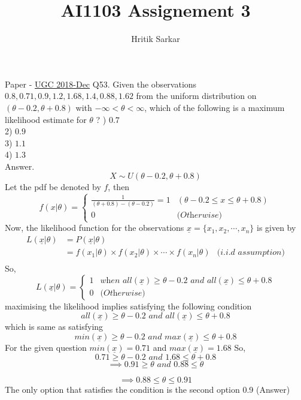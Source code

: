 \documentclass{article}
\title{AI1103 Assignement 3}
\author{Hritik Sarkar}
\theoremstyle{remark}
\renewcommand{\vec}[1]{\underline{#1}}
\begin{document}
\maketitle
Paper - \href{https://github.com/gadepall/papers/blob/master/ugc/math/dec-math-set-a-2018.pdf}{UGC 2018-Dec}
\newline
\newline
Q53. Given the observations $0.8,0.71,0.9,1.2,1.68,1.4,0.88,1.62$ from the uniform distribution on $(\theta-0.2,\theta+0.8)$ with $-\infty< \theta < \infty$, which of the following is a maximum likelihood estimate for $\theta$ ?
) $0.7$ \\
2) $0.9$ \\
3) $1.1$ \\
4) $1.3$ \\
\newline
Answer.
\[
    X \sim U(\theta-0.2,\theta+0.8)
\]
Let the pdf be denoted by $f$, then
\[
    f(x|\theta) = 
    \begin{cases}
     \frac{1}{(\theta+0.8)-(\theta-0.2)} = 1 &(\theta-0.2 \le x \le \theta+0.8)
     \\ 0 &\textit{(Otherwise)}
\end{cases}
\]
\newline
Now, the likelihood function for the observations $\vec{x} = \{x_1,x_2,\cdots,x_n\}$ is given by\\
\begin{align*}
    L(\vec{x}|\theta)&=P(\vec{x}| \theta)\\
    &= f(x_1 |\theta)\times f(x_2 |\theta) \times  \cdots \times f(x_n |\theta) &\textit{(i.i.d assumption)}\\ 
\end{align*}
So,
\[
L(\vec{x}|\theta) = \begin{cases}
 1 &\textit{when $all(\vec{x}) \ge \theta-0.2$ and $all(\vec{x}) \le \theta+0.8$} \\
 0 &\textit{(Otherwise)}
\end{cases}
\]
\newline
maximising the likelihood implies satisfying the following condition
\[
    all(\vec{x}) \ge \theta-0.2 \textit{ and } all(\vec{x}) \le \theta+0.8
\]
which is same as satisfying
\[
    min(\vec{x}) \ge \theta-0.2 \textit{ and } max(\vec{x}) \le \theta+0.8
\]
For the given question $min(\vec{x}) = 0.71$ and $max(\vec{x}) = 1.68$
\newline
So,
\[
    0.71 \ge \theta-0.2 \textit{ and } 1.68 \le \theta+0.8
\]
\[
\implies 0.91 \ge \theta \textit{ and } 0.88 \le \theta
\]

\[
\implies 0.88 \le \theta \le 0.91
\]
The only option that satisfies the condition is the second option 0.9 (Answer)
\end{document}
